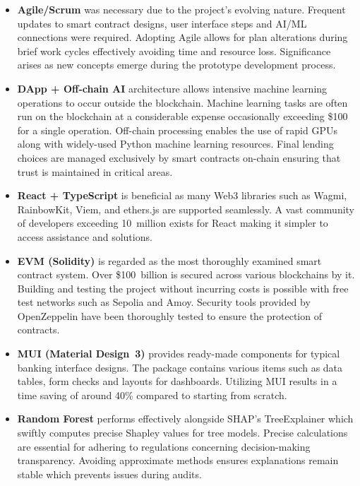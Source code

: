 \documentclass[12pt,a4paper]{report}
\begin{document}
\begin{itemize}[noitemsep]
\item \textbf{Agile/Scrum} was necessary due to the project's evolving nature. Frequent updates to smart contract designs, user interface steps and AI/ML connections were required. Adopting Agile allows for plan alterations during brief work cycles effectively avoiding time and resource loss. Significance arises as new concepts emerge during the prototype development process.

\item \textbf{DApp + Off-chain AI} architecture allows intensive machine learning operations to occur outside the blockchain. Machine learning tasks are often run on the blockchain at a considerable expense occasionally exceeding \$100 for a single operation. Off-chain processing enables the use of rapid GPUs along with widely-used Python machine learning resources. Final lending choices are managed exclusively by smart contracts on-chain ensuring that trust is maintained in critical areas.

\item \textbf{React + TypeScript} is beneficial as many Web3 libraries such as Wagmi, RainbowKit, Viem, and ethers.js are supported seamlessly. A vast community of developers exceeding 10~million exists for React making it simpler to access assistance and solutions.

\item \textbf{EVM (Solidity)} is regarded as the most thoroughly examined smart contract system. Over \$100~billion is secured across various blockchains by it. Building and testing the project without incurring costs is possible with free test networks such as Sepolia and Amoy. Security tools provided by OpenZeppelin have been thoroughly tested to ensure the protection of contracts.

\item \textbf{MUI (Material Design~3)} provides ready-made components for typical banking interface designs. The package contains various items such as data tables, form checks and layouts for dashboards. Utilizing MUI results in a time saving of around 40\% compared to starting from scratch.

\item \textbf{Random Forest} performs effectively alongside SHAP's TreeExplainer which swiftly computes precise Shapley values for tree models. Precise calculations are essential for adhering to regulations concerning decision-making transparency. Avoiding approximate methods ensures explanations remain stable which prevents issues during audits.


\end{itemize}
\end{document}
